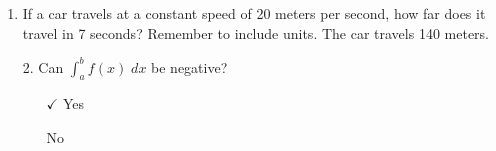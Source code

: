 \documentclass[11pt]{article}
\begin{document}
\pagestyle{empty}
\newsavebox{\quizfront}
\begin{lrbox}{\quizfront}
\begin{minipage}[top][4.5in][t]{\textwidth} \setlength{\parindent}{1.5em}
\drawtitle
\vspace{-0.5in}
\begin{enumerate}

\item If a car travels at a constant speed of 20 meters per second,
  how far does it travel in 7 seconds? Remember to include units.
  \vfill
  {\color{blue} The car travels 140 meters.}
  \vfill
\end{enumerate}


\end{minipage}
\end{lrbox}

\newsavebox{\quizback}
\begin{lrbox}{\quizback}
\begin{minipage}[top][4.5in][t]{\textwidth} \setlength{\parindent}{1.5em}
\begin{enumerate}
\item[2.] Can $\displaystyle\int_a^b f(x)\; dx$ be negative?
  \begin{itemize}
    \vfill
  \item[\textcircled{{\color{blue}$\checkmark$}}] Yes
    \vfill
  \item[\textbigcircle] No
    \vfill
  \end{itemize}
    \vfill

\end{enumerate}
\end{minipage}
\end{lrbox}

\noindent \usebox{\quizfront}
\vfill
\noindent \usebox{\quizback}

\end{document}
